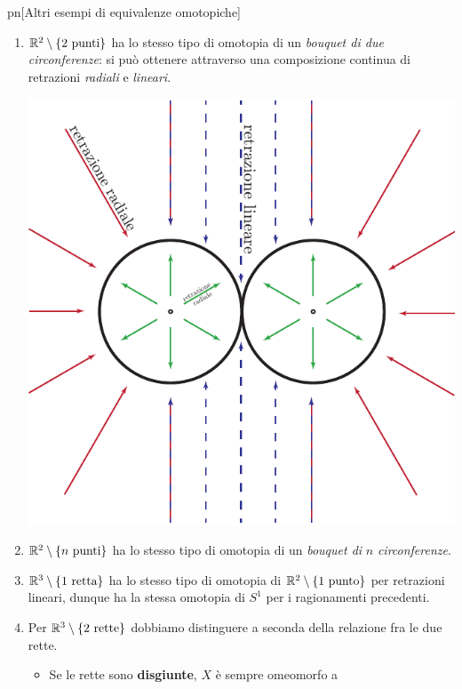 \begin{example}{pn}[Altri esempi di equivalenze omotopiche]~{}
	\begin{enumerate}
		\item $\mathbb{R}^2\setminus\left\{2\text{ punti}\right\}$ ha lo stesso tipo di omotopia di un \textit{bouquet di due circonferenze}: si può ottenere attraverso una composizione continua di retrazioni \textit{radiali} e \textit{lineari}.
		\begin{center}
						\includegraphics[trim=0cm 0cm 0cm 0cm,clip,scale=0.75]{images/bouquetconstruction.pdf}
		\end{center}	
		\item $\mathbb{R}^2\setminus\left\{n\text{ punti}\right\}$ ha lo stesso tipo di omotopia di un \textit{bouquet di} $n$ \textit{circonferenze}.
		\item $\mathbb{R}^3\setminus\left\{1\text{ retta}\right\}$ ha lo stesso tipo di omotopia di $\mathbb{R}^2\setminus\left\{1\ \text{punto}\right\}$ per retrazioni lineari, dunque ha la stessa omotopia di $S^1$ per i ragionamenti precedenti.
		\item Per $\mathbb{R}^3\setminus\left\{2\text{ rette}\right\}$ dobbiamo distinguere a seconda della relazione fra le due rette.
		\begin{itemize}
			\item Se le rette sono \textbf{disgiunte}, $X$ è sempre omeomorfo a

\end{itemize}
\end{enumerate}
\end{example}
